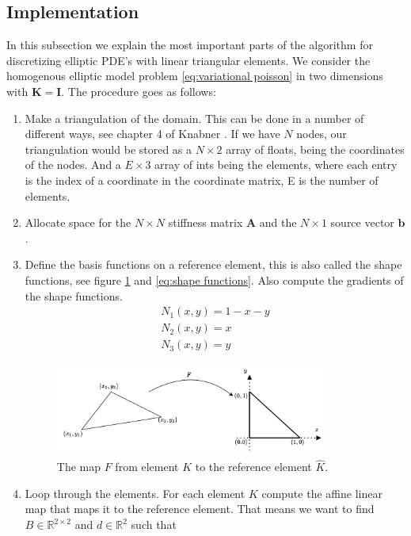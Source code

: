 \documentclass[../Main/main.tex]{subfiles}
\begin{document}
	\subsection*{Implementation}
	In this subsection we explain the most important parts of the algorithm for discretizing elliptic PDE's with linear triangular elements. We consider the homogenous elliptic model problem \eqref{eq:variational poisson} in two dimensions with $\bm{K} = \bm{I}$. The procedure goes as follows:
	\begin{enumerate}
		\item Make a triangulation of the domain. This can be done in a number of different ways, see chapter 4 of Knabner \cite{Knabner}. If we have $N$ nodes, our triangulation would be stored as a $N \times 2$ array of floats, being the coordinates of the nodes. And a $E\times 3$ array of ints being the elements, where each entry is the index of a coordinate in the coordinate matrix, E is the number of elements.
		\item Allocate space for the $N \times N$ stiffness matrix $\bm{A}$ and the $N \times 1$ source vector $\bm{b}$.
		\item Define the basis functions on a reference element, this is also called the shape functions, see figure \ref{fig:reference element} and \eqref{eq:shape functions}. Also compute the gradients of the shape functions. 
		\begin{equation}
			\begin{gathered}\label{eq:shape functions}
				N_1(x,y) = 1-x-y\\
				N_2(x,y) = x\\
				N_3(x,y) = y
			\end{gathered}
		\end{equation}
		\begin{figure}[H]
			\centering
			\includegraphics[width=0.85\textwidth]{reference element.pdf}
			\caption{The map $F$ from element $K$ to the reference element $\hat{K}$.}
			\label{fig:reference element}
		\end{figure}
		\item Loop through the elements. For each element $K$ compute the affine linear map that maps it to the reference element. That means we want to find $B\in \mathbb{R}^{2\times 2}$ and $d\in \mathbb{R}^2$ such that 

\end{enumerate}
\end{document}
